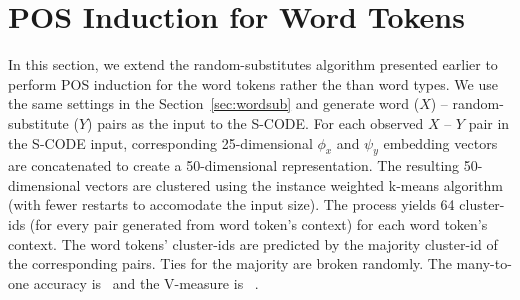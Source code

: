 \section{POS Induction for Word Tokens}
\label{sec:tokens}

In this section, we extend the random-substitutes algorithm presented
earlier to perform POS induction for the word tokens rather the than
word types.  We use the same settings in the Section~\ref{sec:wordsub}
and generate word ($X$) -- random-substitute ($Y$) pairs as the input
to the S-CODE.  For each observed $X$ -- $Y$ pair in the S-CODE input,
corresponding 25-dimensional $\phi_x$ and $\psi_y$ embedding vectors
are concatenated to create a 50-dimensional representation.  The
resulting 50-dimensional vectors are clustered using the instance
weighted k-means algorithm (with fewer restarts to accomodate the
input size).  The process yields 64 cluster-ids (for every pair
generated from word token's context) for each word token's context.
The word tokens' cluster-ids are predicted by the majority cluster-id
of the corresponding pairs.  Ties for the majority are broken
randomly.  The many-to-one accuracy is \wsxymto\ and the V-measure is
\wsxyvm\ .
